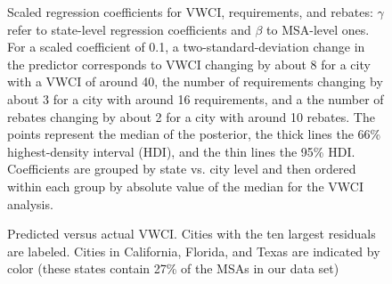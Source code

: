 \documentclass[draft,linenumbers]{agujournal}
\begin{document}
\begin{figure}[h]
\caption{Scaled regression coefficients for VWCI, requirements, and rebates: $\gamma$ refer to state-level regression coefficients and $\beta$ to MSA-level ones.
For a scaled coefficient of 0.1, a two-standard-deviation change in the predictor corresponds to VWCI changing by about 8 for a city with a VWCI of around 40, the number of requirements changing by about 3 for a city with around 16 requirements, and a the number of rebates changing by about 2 for a city with around 10 rebates. The points represent the median of the posterior, the thick lines the 66\% highest-density interval (HDI), and the thin lines the 95\% HDI. Coefficients are grouped by state vs. city level and then ordered within each group by absolute value of the median for the VWCI analysis.}\label{fig:vwci_cat_plot}
\end{figure}


\begin{figure}[h]
\caption{Predicted versus actual VWCI. Cities with the ten largest residuals are labeled. Cities in California, Florida, and Texas are indicated by color (these states contain 27\% of the MSAs in our data set)}\label{fig:vwci_residuals}
\end{figure}


\listofchanges
\end{document}
